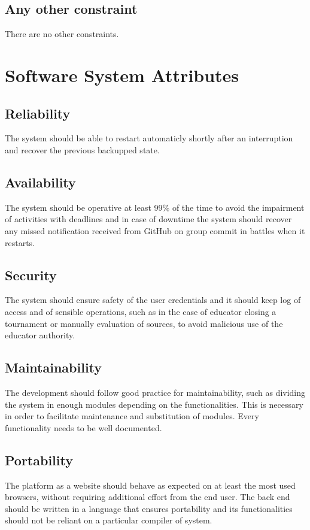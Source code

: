 \subsection{Any other constraint}
There are no other constraints.

\section{Software System Attributes}
\subsection{Reliability}
The system should be able to restart automaticly shortly after an interruption and recover the previous backupped state.

\subsection{Availability}
The system should be operative at least 99\% of the time to avoid the impairment of activities with deadlines and in case of downtime the system should recover any missed notification received from GitHub on group commit in battles when it restarts.

\subsection{Security}
The system should ensure safety of the user credentials and it should keep log of access and of sensible operations, such as in the case of educator closing a tournament or manually evaluation of sources, to avoid malicious use of the educator authority.

\subsection{Maintainability}
The development should follow good practice for maintainability, such as dividing the system in enough modules depending on the functionalities. This is necessary in order to facilitate maintenance and substitution of modules. Every functionality needs to be well documented.

\subsection{Portability}
The platform as a website should behave as expected on at least the most used browsers, without requiring additional effort from the end user. The back end should be written in a language that ensures portability and its functionalities should not be reliant on a particular compiler of system.
